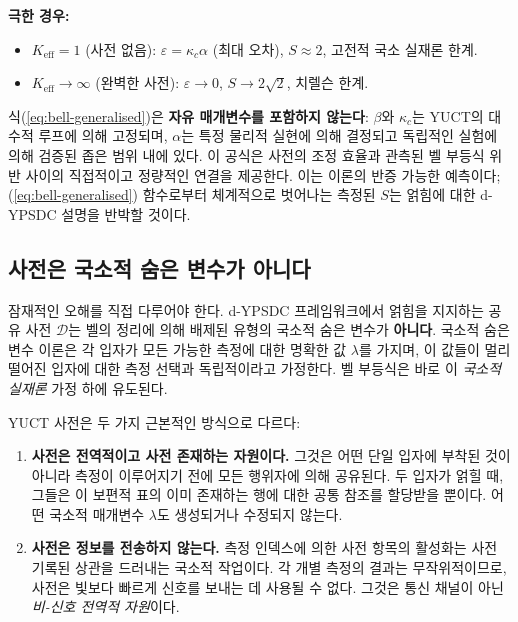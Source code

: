 \documentclass[12pt,a4paper]{article}
\begin{document}
	\noindent
	\textbf{극한 경우:}
	\begin{itemize}
		\item $K_{\mathrm{eff}}=1$ (사전 없음): $\varepsilon = \kappa_c\alpha$ (최대 오차), $S \approx 2$, 고전적 국소 실재론 한계.
		\item $K_{\mathrm{eff}}\to\infty$ (완벽한 사전): $\varepsilon\to0$, $S\to 2\sqrt{2}$, 치렐슨 한계.
	\end{itemize}
	
	식(\ref{eq:bell-generalised})은 \textbf{자유 매개변수를 포함하지 않는다}: $\beta$와 $\kappa_c$는 YUCT의 대수적 루프에 의해 고정되며, $\alpha$는 특정 물리적 실현에 의해 결정되고 독립적인 실험에 의해 검증된 좁은 범위 내에 있다. 이 공식은 사전의 조정 효율과 관측된 벨 부등식 위반 사이의 직접적이고 정량적인 연결을 제공한다. 이는 이론의 반증 가능한 예측이다; (\ref{eq:bell-generalised}) 함수로부터 체계적으로 벗어나는 측정된 $S$는 얽힘에 대한 d-YPSDC 설명을 반박할 것이다.
	
	\subsection*{사전은 국소적 숨은 변수가 아니다}
	
	잠재적인 오해를 직접 다루어야 한다. d-YPSDC 프레임워크에서 얽힘을 지지하는 공유 사전 $\mathcal{D}$는 벨의 정리에 의해 배제된 유형의 국소적 숨은 변수가 \textbf{아니다}. 국소적 숨은 변수 이론은 각 입자가 모든 가능한 측정에 대한 명확한 값 $\lambda$를 가지며, 이 값들이 멀리 떨어진 입자에 대한 측정 선택과 독립적이라고 가정한다. 벨 부등식은 바로 이 \emph{국소적 실재론} 가정 하에 유도된다.
	
	YUCT 사전은 두 가지 근본적인 방식으로 다르다:
	
	\begin{enumerate}[leftmargin=*]
		\item \textbf{사전은 전역적이고 사전 존재하는 자원이다.}
		그것은 어떤 단일 입자에 부착된 것이 아니라 측정이 이루어지기 전에 모든 행위자에 의해 공유된다. 두 입자가 얽힐 때, 그들은 이 보편적 표의 이미 존재하는 행에 대한 공통 참조를 할당받을 뿐이다. 어떤 국소적 매개변수 $\lambda$도 생성되거나 수정되지 않는다.
		
		\item \textbf{사전은 정보를 전송하지 않는다.}
		측정 인덱스에 의한 사전 항목의 활성화는 사전 기록된 상관을 드러내는 국소적 작업이다. 각 개별 측정의 결과는 무작위적이므로, 사전은 빛보다 빠르게 신호를 보내는 데 사용될 수 없다. 그것은 통신 채널이 아닌 \emph{비-신호 전역적 자원}이다.
	\end{enumerate}
	
\end{document}

